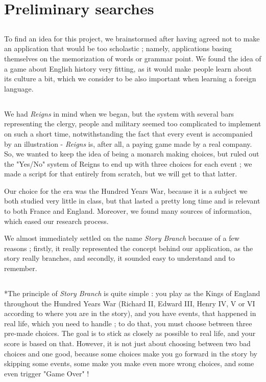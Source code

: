 \documentclass{scrreprt}
\begin{document}
\section{Preliminary searches}

\subsection*{}To find an idea for this project, we brainstormed after having agreed not to make an application that would be too scholastic ; namely, applications basing themselves on the memorization of words or grammar point. We found the idea of a game about English history very fitting, as it would make people learn about its culture a bit, which we consider to be also important when learning a foreign language.

\subsection*{} We had \textit{Reigns} in mind when we began, but the system with several bars representing the clergy, people and military seemed too complicated to implement on such a short time, notwithstanding the fact that every event is accompanied by an illustration - \textit{Reigns} is, after all, a paying game made by a real company. So, we wanted to keep the idea of being a monarch making choices, but ruled out the "Yes/No" system of Reigns to end up with three choices for each event ; we made a script for that entirely from scratch, but we will get to that latter.

Our choice for the era was the Hundred Years War, because it is a subject we both studied very little in class, but that lasted a pretty long time and is relevant to both France and England. Moreover, we found many sources of information, which eased our research process.

We almost immediately settled on the name \textit{Story Branch} because of a few reasons ; firstly, it really represented the concept behind our application, as the story really branches, and secondly, it sounded easy to understand and to remember.

\subsection{}*The principle of \textit{Story Branch} is quite simple : you play as the Kings of England throughout the Hundred Years War (Richard II, Edward III, Henry IV, V or VI according to where you are in the story), and you have events, that happened in real life, which you need to handle ; to do that, you must choose between three pre-made choices. The goal is to stick as closely as possible to real life, and your score is based on that. However, it is not just about choosing between two bad choices and one good, because some choices make you go forward in the story by skipping some events, some make you make even more wrong choices, and some even trigger "Game Over" !
\end{document}
